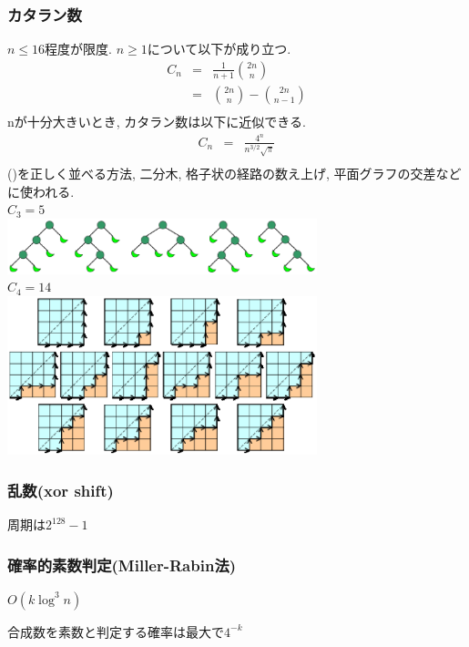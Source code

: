 \documentclass[9pt,twocolumn,a4paper,landscape]{extarticle}
\begin{document}
\subsubsection{カタラン数}
$n\leq 16$程度が限度. $n\geq 1$について以下が成り立つ.
\begin{eqnarray*}
  C_n &=& \frac{1}{n+1}\binom{2n}{n}\\
      &=& \binom{2n}{n}-\binom{2n}{n-1}\\
\end{eqnarray*}
nが十分大きいとき, カタラン数は以下に近似できる.
\begin{eqnarray*}
  C_n &=& \frac{4^n}{n^{3/2}\sqrt{\pi}}\\
\end{eqnarray*}
()を正しく並べる方法, 二分木, 格子状の経路の数え上げ, 平面グラフの交差などに使われる.\\
$C_3=5$\\
\includegraphics[width=9cm, clip]{img/Catalan_tree.eps}\\
$C_4=14$\\
\includegraphics[width=9cm, clip]{img/Catalan_graph.eps}\\

\subsubsection{乱数(xor shift)}
周期は$2^{128}-1$


\subsubsection{確率的素数判定(Miller-Rabin法)}
$O(k\log^3n)$\par
合成数を素数と判定する確率は最大で$4^{-k}$\\

\end{document}
